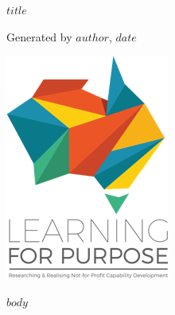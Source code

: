 \documentclass[11pt, a4paper]{article}
\begin{document}
\pagestyle{fancy}

\begin{titlepage}
	\centering
	
	{%
		\fontsize{30pt}{30pt}\selectfont
		$title$
	}%
	
	\vspace*{2\baselineskip}
	{\footnotesize Generated by $author$, $date$}
	
	\vspace*{5\baselineskip}
	
	\includegraphics[width=.75\textwidth]{www/LFP_vertical_tagline.png}
	
	\vspace*{\baselineskip}
	
	\tableofcontents
	
	\thispagestyle{empty}
\end{titlepage}

\clearpage

\onehalfspacing
\raggedright

$body$

\clearpage
\end{document}
